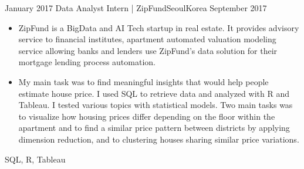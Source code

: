 \begin{experiences}
  
 \experience
    {January 2017} {Data Analyst Intern | ZipFund}{Seoul}{Korea}
    {September 2017}    {\begin{itemize}
               \item ZipFund is a BigData and AI Tech startup in real estate. It provides advisory service to financial institutes, apartment automated valuation modeling service allowing banks and lenders use ZipFund's data solution for their mortgage lending process automation.

               \item  My main task was to find meaningful insights that would help people estimate house price. I used SQL to retrieve data and analyzed with R and Tableau. I tested various topics with statistical models. Two main tasks was to visualize how housing prices differ depending on the floor within the apartment and to find a similar price pattern between districts by applying dimension reduction, and to clustering houses sharing similar price variations. 
               \end{itemize}}
            {SQL, R, Tableau}
  \emptySeparator
  
  
  
  
\end{experiences}
